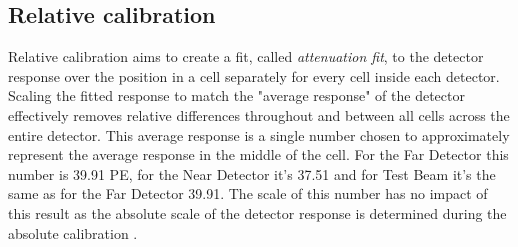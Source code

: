 \documentclass[12pt,a4paper]{article}
\begin{document}
\subsection{Relative calibration}


Relative calibration aims to create a fit, called \textit{attenuation fit}, to the detector response over the position in a cell separately for every cell inside each detector. Scaling the fitted response to match the "average response" of the detector effectively removes relative differences throughout and between all cells across the entire detector. This average response is a single number chosen to approximately represent the average response in the middle of the cell. For the Far Detector this number is 39.91 PE, for the Near Detector it's 37.51 and for Test Beam it's the same as for the Far Detector 39.91. The scale of this number has no impact of this result as the absolute scale of the detector response is determined during the absolute calibration \cite{NOVA-doc-7410,NOVA-doc-13579-SAAttenuationAndThreshold}.
 
\end{document}

